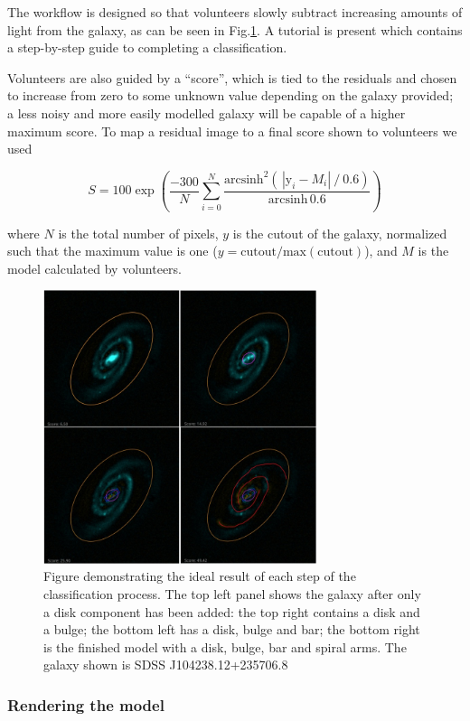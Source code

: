 \documentclass[../main.tex]{subfiles}
\begin{document}
The workflow is designed so that volunteers slowly subtract increasing amounts of light from the galaxy, as can be seen in Fig.\ref{fig:residualsStepByStep}. A tutorial is present which contains a step-by-step guide to completing a classification.

Volunteers are also guided by a ``score'', which is tied to the residuals and chosen to increase from zero to some unknown value depending on the galaxy provided; a less noisy and more easily modelled galaxy will be capable of a higher maximum score. To map a residual image to a final score shown to volunteers we used

\begin{equation*}
    S = 100 \exp\left(\frac{-300}{N}\sum_{i=0}^N\frac{\text{arcsinh}^2\left(\,|\text{y}_i - M_i|\ /\ 0.6\right)}{\text{arcsinh}\,0.6 }\right)
\end{equation*}

where $N$ is the total number of pixels, $y$ is the cutout of the galaxy, normalized such that the maximum value is one ($y = \text{cutout}/\text{max}(\text{cutout})$), and $M$ is the model calculated by volunteers.


\begin{figure}
  \includegraphics[width=8cm]{images/residualProgress.jpg}
  \caption{Figure demonstrating the ideal result of each step of the classification process. The top left panel shows the galaxy after only a disk component has been added: the top right contains a disk and a bulge; the bottom left has a disk, bulge and bar; the bottom right is the finished model with a disk, bulge, bar and spiral arms. The galaxy shown is SDSS J104238.12+235706.8}
  \label{fig:residualsStepByStep}
\end{figure}

\subsubsection{Rendering the model}
\end{document}
